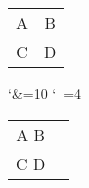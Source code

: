 \documentclass{beamer}
\newenvironment{mytabular}[2][c]{%
    \catcode`\&=10
    \catcode`\ =4
    \begin{tabular}[#1]{#2}
    }{%
\end{tabular}
}
\begin{document}
    \begin{frame}
        \begin{tabular}{cc}
            A & B \pause \\
            C & D
        \end{tabular}
    \end{frame}

    \begin{frame}
        \begin{mytabular}{cc}
                    A B\\\pause
                    C D
        \end{mytabular}
    \end{frame}
\end{document}
